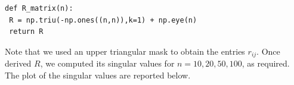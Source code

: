 \documentclass[a4paper,11pt]{article}
\begin{document}
\begin{verbatim}
def R_matrix(n):
 R = np.triu(-np.ones((n,n)),k=1) + np.eye(n)
 return R
\end{verbatim}
Note that we used an upper triangular mask to obtain the entries $r_{ij}$. Once derived $R$, we computed its singular values for $n = 10,20,50,100$, as required. The plot of the singular values are reported below. 
\begin{figure}[H]
	\centering
	 \qquad {} \\

\end{figure}
\end{document}
